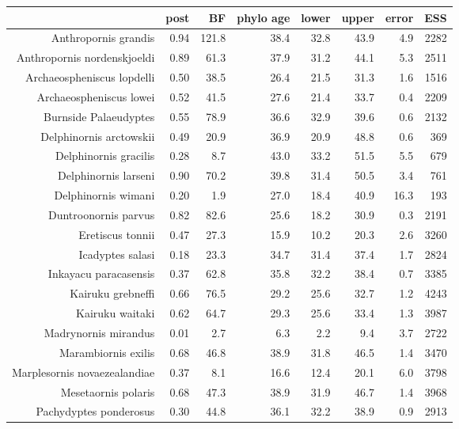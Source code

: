 \begin{table}[ht]
\centering
\begin{tabular}{rrrrrrrr}
  \hline
 & post & BF & phylo age & lower & upper & error & ESS \\ 
  \hline
Anthropornis grandis & 0.94 & 121.8 & 38.4 & 32.8 & 43.9 & 4.9 & 2282 \\ 
  Anthropornis nordenskjoeldi & 0.89 & 61.3 & 37.9 & 31.2 & 44.1 & 5.3 & 2511 \\ 
  Archaeospheniscus lopdelli & 0.50 & 38.5 & 26.4 & 21.5 & 31.3 & 1.6 & 1516 \\ 
  Archaeospheniscus lowei & 0.52 & 41.5 & 27.6 & 21.4 & 33.7 & 0.4 & 2209 \\ 
  Burnside Palaeudyptes & 0.55 & 78.9 & 36.6 & 32.9 & 39.6 & 0.6 & 2132 \\ 
  Delphinornis arctowskii & 0.49 & 20.9 & 36.9 & 20.9 & 48.8 & 0.6 & 369 \\ 
  Delphinornis gracilis & 0.28 & 8.7 & 43.0 & 33.2 & 51.5 & 5.5 & 679 \\ 
  Delphinornis larseni & 0.90 & 70.2 & 39.8 & 31.4 & 50.5 & 3.4 & 761 \\ 
  Delphinornis wimani & 0.20 & 1.9 & 27.0 & 18.4 & 40.9 & 16.3 & 193 \\ 
  Duntroonornis parvus & 0.82 & 82.6 & 25.6 & 18.2 & 30.9 & 0.3 & 2191 \\ 
  Eretiscus tonnii & 0.47 & 27.3 & 15.9 & 10.2 & 20.3 & 2.6 & 3260 \\ 
  Icadyptes salasi & 0.18 & 23.3 & 34.7 & 31.4 & 37.4 & 1.7 & 2824 \\ 
  Inkayacu paracasensis & 0.37 & 62.8 & 35.8 & 32.2 & 38.4 & 0.7 & 3385 \\ 
  Kairuku grebneffi & 0.66 & 76.5 & 29.2 & 25.6 & 32.7 & 1.2 & 4243 \\ 
  Kairuku waitaki & 0.62 & 64.7 & 29.3 & 25.6 & 33.4 & 1.3 & 3987 \\ 
  Madrynornis mirandus & 0.01 & 2.7 & 6.3 & 2.2 & 9.4 & 3.7 & 2722 \\ 
  Marambiornis exilis & 0.68 & 46.8 & 38.9 & 31.8 & 46.5 & 1.4 & 3470 \\ 
  Marplesornis novaezealandiae & 0.37 & 8.1 & 16.6 & 12.4 & 20.1 & 6.0 & 3798 \\ 
  Mesetaornis polaris & 0.68 & 47.3 & 38.9 & 31.9 & 46.7 & 1.4 & 3968 \\ 
  Pachydyptes ponderosus & 0.30 & 44.8 & 36.1 & 32.2 & 38.9 & 0.9 & 2913 \\ 

\end{tabular}
\end{table}
